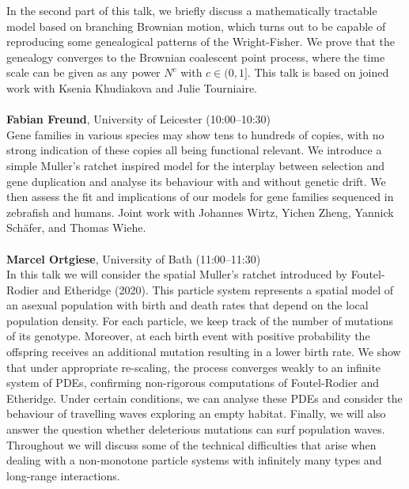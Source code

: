 \documentclass[12pt,a4paper]{article}
\begin{document}
 In the second part of this talk, we briefly discuss a mathematically tractable model based on branching Brownian motion, which turns out to be capable of reproducing some genealogical patterns of the Wright-Fisher. We prove that the genealogy converges to the Brownian coalescent point process, where the time scale can be given as any power $N^c$ with $c \in (0,1]$. This talk is based on joined work with Ksenia Khudiakova and Julie Tourniaire. \\
\\[1ex]{ \large \textbf{ Fabian Freund}}, University of Leicester (10:00--10:30) \\[2ex] Gene families in various species may show tens to hundreds of copies, with no strong indication of these copies all being functional relevant. We introduce a simple Muller's ratchet inspired model for the interplay between selection and gene duplication and analyse its behaviour with and without genetic drift. We then assess the fit and implications of our models for gene families sequenced in zebrafish and humans. Joint work with Johannes Wirtz, Yichen Zheng, Yannick Schäfer, and Thomas Wiehe. \\
\\[1ex]{ \large \textbf{ Marcel Ortgiese}}, University of Bath (11:00--11:30) \\[2ex] In this talk we will consider the spatial Muller's ratchet introduced by Foutel-Rodier and Etheridge (2020). This particle system represents a spatial model of an asexual population with birth and death rates that depend on the local population density. For each particle, we keep track of the number of mutations of its genotype. Moreover, at each birth event with positive probability the offspring receives an additional mutation resulting in a lower birth rate. We show that under appropriate re-scaling, the process converges weakly to an infinite system of PDEs, confirming non-rigorous computations of Foutel-Rodier and Etheridge. Under certain conditions, we can analyse these PDEs and consider the behaviour of travelling waves exploring an empty habitat. Finally, we will also answer the question whether deleterious mutations can surf population waves. Throughout we will discuss some of the technical difficulties that arise when dealing with a non-monotone particle systems with infinitely many types and long-range interactions. 
\end{document}
